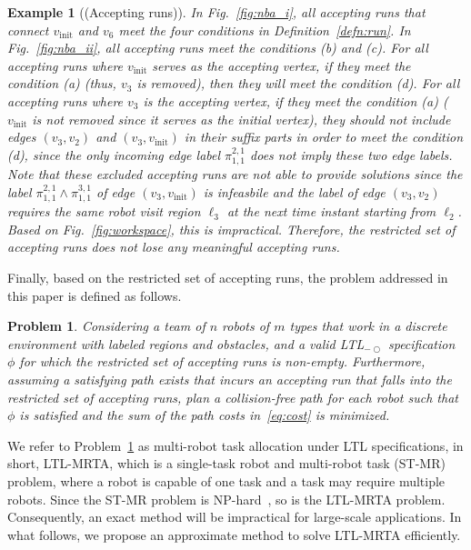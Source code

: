 \documentclass[Afour,sageh,times]{sagej}
\newtheorem{problem}{Problem}
\newtheorem{exmp}{Example}
\newcommand{\ltl}{ {\it LTL}$_{-\bigcirc}$ }
\newcommand{\vertex}[1]{v_{\text{#1}}}
\renewcommand{\ap}[3]{\mathcal{\pi}_{{#1},{#2}}^{#3}}
\newenvironment{cexmp}
{\addtocounter{exmp}{-1}\begin{exmp}}
  {\end{exmp}}
\begin{document}
\begin{cexmp}[(Accepting runs)]
  In Fig.~\ref{fig:nba_i}, all accepting runs that connect $v_{\text{init}}$ and $v_6$ meet the four conditions in Definition~\ref{defn:run}. In Fig.~\ref{fig:nba_ii}, all accepting runs meet the conditions (b) and (c). For all accepting runs where $\vertex{init}$ serves as the accepting vertex, if they  meet the condition (a) (thus, $v_3$ is removed), then they  will meet the condition (d). For all accepting runs where $v_3$ is the accepting vertex, if they meet the condition (a) ($\vertex{init}$ is not removed since it serves as the initial vertex), they should not include edges $(v_3, v_2)$ and $(v_3, \vertex{init})$ in their suffix parts in order to meet the condition (d), since the only incoming edge label $\ap{1}{1}{2,1}$ does not imply these two edge labels. Note that these excluded  accepting runs are not able to provide solutions since the label $\ap{1}{1}{2,1} \wedge \ap{1}{1}{3,1}$ of edge $(v_3, \vertex{init})$ is infeasbile and the label of edge $(v_3, v_2)$ requires the same robot visit region $\ell_3$ at the next time instant starting from $\ell_2$. Based on Fig.~\ref{fig:workspace}, this is impractical. Therefore, the restricted set of accepting runs does not lose any  meaningful accepting runs.
\end{cexmp}

Finally, based on  the restricted set of accepting runs, the problem addressed in this paper is defined as follows.

\begin{problem}\label{prob:1}
Considering a team of $n$ robots of $m$ types that work in a discrete environment with labeled regions and obstacles, and a valid \ltl specification $\phi$ for which the restricted set of accepting runs is non-empty. Furthermore, assuming a satisfying path exists that incurs an accepting run that falls into the restricted set of accepting runs, plan a collision-free path for each robot such that $\phi$ is satisfied and the sum of the path costs in~\eqref{eq:cost} is minimized.
\end{problem}

We refer to Problem~\ref{prob:1} as multi-robot task allocation under LTL specifications, in short, LTL-MRTA, which is a single-task robot and multi-robot task (ST-MR) problem, where a robot is capable of one task and a task may require multiple robots. Since the ST-MR problem is NP-hard~\cite{korsah2013comprehensive,nunes2017taxonomy}, so is the LTL-MRTA problem. Consequently, an exact method will be impractical for large-scale applications. In what follows, we propose an approximate method to solve LTL-MRTA efficiently.
\end{document}
